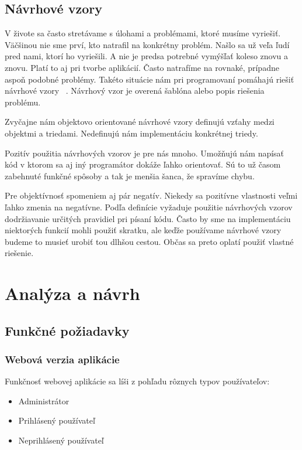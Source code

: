 \documentclass[12pt]{book}
\begin{document}
\section{Návrhové vzory}
V živote sa často stretávame s úlohami a problémami, ktoré musíme vyriešiť. Väčšinou nie sme prví, kto natrafil na konkrétny problém. Našlo sa už veľa ľudí pred nami, ktorí ho vyriešili. A nie je predsa potrebné vymýšľať koleso znovu a znovu. Platí to aj pri tvorbe aplikácií.  Často natrafíme na rovnaké, prípadne aspoň podobné problémy. Takéto situácie nám pri programovaní pomáhajú riešiť návrhové vzory \cite{NavrhoveVzory}\ . Návrhový vzor je overená šablóna alebo popis riešenia problému.

Zvyčajne nám objektovo orientované návrhové vzory definujú vzťahy medzi objektmi a triedami. Nedefinujú nám implementáciu konkrétnej triedy.  

Pozitív použitia návrhových vzorov je pre nás mnoho. Umožňujú nám napísať kód v ktorom sa aj iný programátor dokáže ľahko orientovať. Sú to už časom zabehnuté funkčné spôsoby a tak je menšia šanca, že spravíme chybu. 

Pre objektívnosť spomeniem aj pár negatív. Niekedy sa pozitívne vlastnosti veľmi ľahko zmenia na negatívne. Podľa definície vyžaduje použitie návrhových vzorov dodržiavanie určitých pravidiel pri písaní kódu. Často by sme na implementáciu niektorých funkcií mohli použiť skratku, ale keďže používame návrhové vzory budeme to musieť urobiť tou dlhšou cestou. Občas sa preto oplatí použiť vlastné riešenie.

\chapter{Analýza a návrh}
\section{Funkčné požiadavky}
\subsection{Webová verzia aplikácie}
Funkčnosť webovej aplikácie sa líši z pohľadu rôznych typov používateľov:
\begin{itemize}
\item{Administrátor}
\item{Prihlásený používateľ}
\item{Neprihlásený používateľ}
\end{itemize}
\end{document}
